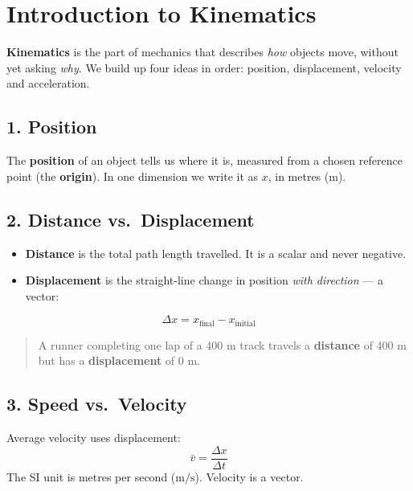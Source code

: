 
\section*{Introduction to Kinematics}

\textbf{Kinematics} is the part of mechanics that describes \emph{how}
objects move, without yet asking \emph{why}. We build up four ideas in
order: position, displacement, velocity and acceleration.

\subsection*{1. Position}
The \textbf{position} of an object tells us where it is, measured from a
chosen reference point (the \textbf{origin}). In one dimension we write it
as $x$, in metres (m).

\subsection*{2. Distance vs.\ Displacement}
\begin{itemize}
  \item \textbf{Distance} is the total path length travelled. It is a
        scalar and never negative.
  \item \textbf{Displacement} is the straight-line change in position
        \emph{with direction} --- a vector:
\end{itemize}
\begin{equation}
  \Delta x = x_{\text{final}} - x_{\text{initial}}
\end{equation}
\begin{quote}
A runner completing one lap of a 400 m track travels a \textbf{distance}
of 400 m but has a \textbf{displacement} of 0 m.
\end{quote}

\subsection*{3. Speed vs.\ Velocity}
Average velocity uses displacement:
\begin{equation}
  \bar{v} = \frac{\Delta x}{\Delta t}
\end{equation}
The SI unit is metres per second ($\text{m/s}$). Velocity is a vector.

